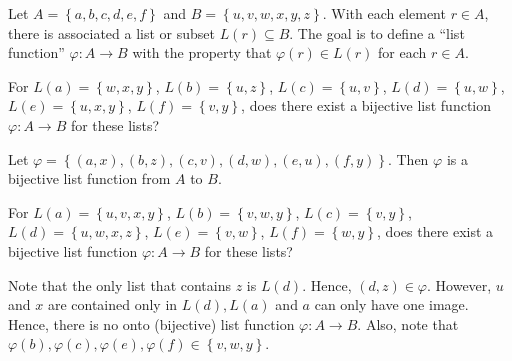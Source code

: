 \documentclass[12pt]{article}
\newenvironment{problem}[2][Problem]{\begin{trivlist} \item[\hskip \labelsep {\bfseries #1}\hskip \labelsep {\bfseries #2.}]}{\end{trivlist}}
\newenvironment{solution}[1][Solution]{\begin{trivlist} \item[\hskip \labelsep {\bfseries #1}]}{\end{trivlist}}
\begin{document}
    \begin{problem}{36}
      Let $A=\left\{ a,b,c,d,e,f \right\}$ and $B=\left\{u,v,w,x,y,z \right\}$. With each element $r\in A$, there is associated a list or subset $L(r) \subseteq B$. The goal is to define a ``list function'' $\varphi: A\to B$ with the property that $\varphi(r)\in L(r)$ for each $r\in A$.
    \begin{enumerate}
      \item For $L(a) = \left\{ w,x,y \right\}$, $L(b)=\left\{ u,z \right\}$, $L(c)=\left\{ u,v \right\}$, $L(d)=\left\{ u,w \right\}$, $L(e)=\left\{ u,x,y \right\}$, $L(f)=\left\{ v,y \right\}$, does there exist a bijective list function $\varphi: A\to B$ for these lists?
    \begin{solution}
      Let $\varphi = \left\{ (a,x), (b,z), (c,v), (d,w), (e,u), (f,y) \right\}$. Then $\varphi$ is a bijective list function from $A$ to $B$. 
    \end{solution}
      \item For $L(a) = \left\{ u,v,x,y \right\}$, $L(b)=\left\{ v,w,y \right\}$, $L(c)=\left\{ v,y \right\}$, $L(d)=\left\{ u,w,x,z \right\}$, $L(e)=\left\{ v,w \right\}$, $L(f)=\left\{ w,y \right\}$, does there exist a bijective list function $\varphi: A\to B$ for these lists?
    \begin{solution}
      Note that the only list that contains $z$ is $L(d)$. Hence, $(d,z)\in \varphi$. However, $u$ and $x$ are contained only in $L(d),L(a)$ and $a$ can only have one image. Hence, there is no onto (bijective) list function $\varphi: A\to B$. Also, note that $\varphi(b),\varphi(c),\varphi(e),\varphi(f)\in \left\{ v,w,y \right\}$.
    \end{solution}
    \end{enumerate}
    \end{problem}
       
\end{document}
